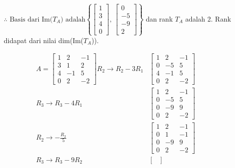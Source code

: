 \documentclass[12pt, a4paper]{scrartcl}
\begin{document}
\begin{enumerate}
\begin{enumerate}
            \begin{itemize}
                \item[$\therefore$] $\mbox{Basis dari Im(}T_A \mbox{) adalah} \left\{ \begin{bmatrix}
                    1\\3\\4\\0
                \end{bmatrix}\mbox{, } \begin{bmatrix}
                    0\\-5\\-9\\2
                \end{bmatrix} \right\}$ dan rank $T_A$ adalah 2. Rank didapat dari nilai dim(Im($T_A$)). 
            \end{itemize}
            \begin{align*}
                A=\begin{bmatrix}
                    1 & 2 & -1\\
                    3 & 1 & 2\\
                    4 & -1 & 5\\
                    0 & 2 & -2
                \end{bmatrix} R_2\to R_2-3R_1 &\begin{bmatrix}
                    1 & 2 & -1\\
                    0 & -5 & 5\\
                    4 & -1 & 5\\
                    0 & 2 & -2
                \end{bmatrix} \\R_3\to R_3 - 4R_1 &\begin{bmatrix}
                    1 & 2 & -1\\
                    0 & -5 & 5\\
                    0 & -9 & 9\\
                    0 & 2 & -2
                \end{bmatrix} \\R_2\to -\frac{R_2}{5} &\begin{bmatrix}
                    1 & 2 & -1\\
                    0 & 1 & -1\\
                    0 & -9 & 9\\
                    0 & 2 & -2
                \end{bmatrix} \\R_3\to R_3 -9R_2 &\begin{bmatrix}

\end{bmatrix}
\end{align*}
\end{enumerate}
\end{enumerate}
\end{document}
